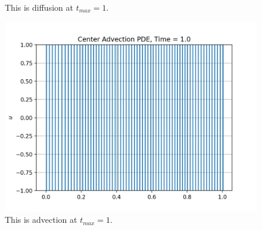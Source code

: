 \documentclass[12pt]{article}
\begin{document}
\begin{enumerate}[label=(\alph*)]
\begin{figure}[htb]
\begin{minipage}[c]{0.48\textwidth}
			\caption{This is diffusion at $t_{max} = 1$.}
			\label{fig:ad3}
		\end{minipage}
		\hspace{0.1in}
		\begin{minipage}[c]{0.48\textwidth}
			\centering
			\includegraphics[width=0.7\linewidth]{./PDE/figures/advection_128_center/result_advection_128_center_1.png}
			\caption{This is advection at $t_{max} = 1$.}
			\label{fig:ad4}
		\end{minipage}
		\newline
		\vspace{-0.2in}
	\end{figure}
	

\end{enumerate}
\end{document}
